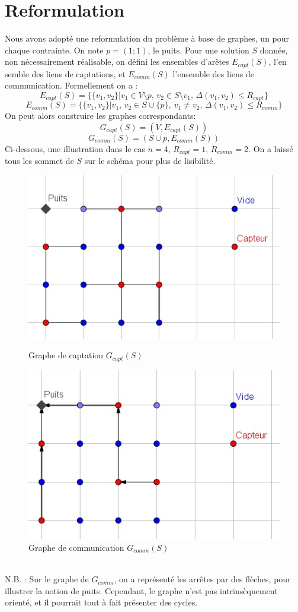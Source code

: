\documentclass[12pt,a4paper]{article}
\begin{document}
\section{Reformulation}
Nous avons adopté une reformulation du problème à base de graphes, un pour chaque contrainte. On note $p=(1;1)$, le puits. 
Pour une solution $S$ donnée, non nécessairement réalisable, on défini les ensembles d'arêtes $E_{capt}(S)$, l'en semble des liens de captations, et $E_{comm}(S)$ l'ensemble des liens de communication. Formellement on a :
\[E_{capt}(S)=\{\{v_1,v_2\}|v_1\in V\setminus p,\,v_2\in S\setminus v_1,\, \Delta(v_1,v_2)\leq R_{capt}\}\] 
\[E_{comm}(S)=\{\{v_1,v_2\}|v_1,\,v_2\in S\cup \{p\},\ v_1\neq v_2,\,\Delta(v_1,v_2)\leq R_{comm}\}\] 
On peut alors construire les graphes correspondants:
\[G_{capt}(S)=(V,E_{capt}(S))\]
\[G_{comm}(S)=(S\cup p,E_{comm}(S))\]
Ci-dessous, une illustration dans le cas $n=4$, $R_{capt}=1$, $R_{comm}=2$. On a laissé tous les sommet de $S$ sur le schéma pour plus de lisibilité.
\begin{figure}[!h]
\center
\includegraphics[scale=1]{Images/4_1_2_captgraph.jpg}
\caption{Graphe de captation $G_{capt}(S)$}
\includegraphics[scale=1]{Images/4_1_2_commgraph.jpg}
\caption{Graphe de communication $G_{comm}(S)$}
\end{figure}
\\N.B. : Sur le graphe de $G_{comm}$, on a représenté les arrêtes par des flèches, pour illustrer la notion de puits. Cependant, le graphe n'est pas intrinsèquement orienté, et il pourrait tout à fait présenter des cycles.
\end{document}
